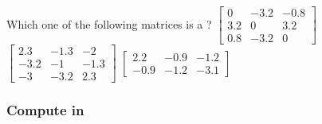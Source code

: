 \begin{activity}
Which one of the following matrices is a ?
{\(\begin{bmatrix} 0&-3.2&-0.8
\\3.2&0&3.2
\\0.8&-3.2&0 \end{bmatrix}\)}
{\(\begin{bmatrix} 2.3&-1.3&-2
\\-3.2&-1&-1.3
\\-3&-3.2&2.3 \end{bmatrix}\)}
{\(\begin{bmatrix} 2.2&-0.9&-1.2
\\-0.9&-1.2&-3.1 \end{bmatrix}\)}
\end{activity}
   








\subsubsection{Compute in \script}

